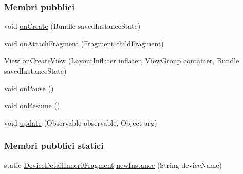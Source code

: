 \subsubsection*{Membri pubblici}
\begin{DoxyCompactItemize}
\item 
void \hyperlink{classit_1_1unibo_1_1torsello_1_1bluetoothpositioning_1_1fragment_1_1DeviceDetailInner0Fragment_a799f69a27b82be0bf972611b1743e8bd_a799f69a27b82be0bf972611b1743e8bd}{on\+Create} (Bundle saved\+Instance\+State)
\item 
void \hyperlink{classit_1_1unibo_1_1torsello_1_1bluetoothpositioning_1_1fragment_1_1DeviceDetailInner0Fragment_a0893d44029c05595acc4cbe5bb458772_a0893d44029c05595acc4cbe5bb458772}{on\+Attach\+Fragment} (Fragment child\+Fragment)
\item 
View \hyperlink{classit_1_1unibo_1_1torsello_1_1bluetoothpositioning_1_1fragment_1_1DeviceDetailInner0Fragment_a7a1163483f1abdefe3f08bcd67ff4f08_a7a1163483f1abdefe3f08bcd67ff4f08}{on\+Create\+View} (Layout\+Inflater inflater, View\+Group container, Bundle saved\+Instance\+State)
\item 
void \hyperlink{classit_1_1unibo_1_1torsello_1_1bluetoothpositioning_1_1fragment_1_1DeviceDetailInner0Fragment_a8fc220176497363521dd4b0b190e4c49_a8fc220176497363521dd4b0b190e4c49}{on\+Pause} ()
\item 
void \hyperlink{classit_1_1unibo_1_1torsello_1_1bluetoothpositioning_1_1fragment_1_1DeviceDetailInner0Fragment_a2ccd1bfbb26e6896ccdbeb4eb4c6adcb_a2ccd1bfbb26e6896ccdbeb4eb4c6adcb}{on\+Resume} ()
\item 
void \hyperlink{classit_1_1unibo_1_1torsello_1_1bluetoothpositioning_1_1fragment_1_1DeviceDetailInner0Fragment_aa80acc0e82730a27b0085e5da3087d20_aa80acc0e82730a27b0085e5da3087d20}{update} (Observable observable, Object arg)
\end{DoxyCompactItemize}
\subsubsection*{Membri pubblici statici}
\begin{DoxyCompactItemize}
\item 
static \hyperlink{classit_1_1unibo_1_1torsello_1_1bluetoothpositioning_1_1fragment_1_1DeviceDetailInner0Fragment}{Device\+Detail\+Inner0\+Fragment} \hyperlink{classit_1_1unibo_1_1torsello_1_1bluetoothpositioning_1_1fragment_1_1DeviceDetailInner0Fragment_a56724b3b2fecf5bbaa0832aed0b2e318_a56724b3b2fecf5bbaa0832aed0b2e318}{new\+Instance} (String device\+Name)
\end{DoxyCompactItemize}
